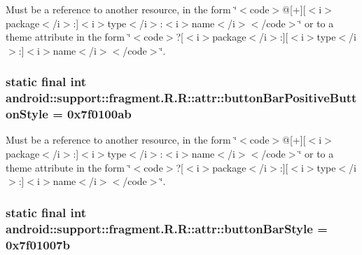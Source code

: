 Must be a reference to another resource, in the form \char`\"{}$<$code$>$@\mbox{[}+\mbox{]}\mbox{[}$<$i$>$package$<$/i$>$:\mbox{]}$<$i$>$type$<$/i$>$:$<$i$>$name$<$/i$>$$<$/code$>$\char`\"{} or to a theme attribute in the form \char`\"{}$<$code$>$?\mbox{[}$<$i$>$package$<$/i$>$:\mbox{]}\mbox{[}$<$i$>$type$<$/i$>$:\mbox{]}$<$i$>$name$<$/i$>$$<$/code$>$\char`\"{}. \hypertarget{classandroid_1_1support_1_1fragment_1_1_r_1_1attr_49255386968d0f785f27e9d3581f6ec7}{
\subsubsection[{buttonBarPositiveButtonStyle}]{\setlength{\rightskip}{0pt plus 5cm}static final int android::support::fragment.R.R::attr::buttonBarPositiveButtonStyle = 0x7f0100ab}}
\label{classandroid_1_1support_1_1fragment_1_1_r_1_1attr_49255386968d0f785f27e9d3581f6ec7}


Must be a reference to another resource, in the form \char`\"{}$<$code$>$@\mbox{[}+\mbox{]}\mbox{[}$<$i$>$package$<$/i$>$:\mbox{]}$<$i$>$type$<$/i$>$:$<$i$>$name$<$/i$>$$<$/code$>$\char`\"{} or to a theme attribute in the form \char`\"{}$<$code$>$?\mbox{[}$<$i$>$package$<$/i$>$:\mbox{]}\mbox{[}$<$i$>$type$<$/i$>$:\mbox{]}$<$i$>$name$<$/i$>$$<$/code$>$\char`\"{}. \hypertarget{classandroid_1_1support_1_1fragment_1_1_r_1_1attr_ef3ad6e49cd1771a724fb6c6016df3db}{
\subsubsection[{buttonBarStyle}]{\setlength{\rightskip}{0pt plus 5cm}static final int android::support::fragment.R.R::attr::buttonBarStyle = 0x7f01007b}}
\label{classandroid_1_1support_1_1fragment_1_1_r_1_1attr_ef3ad6e49cd1771a724fb6c6016df3db}


